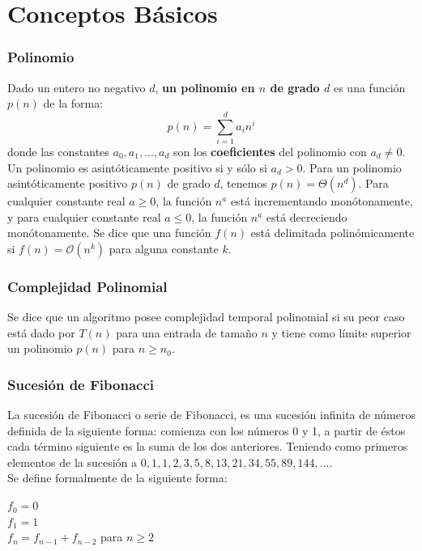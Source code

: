 \documentclass{report}
\begin{document}
\section*{Conceptos B\'asicos}
    \subsubsection*{Polinomio}
        Dado un entero no negativo $d$, \textbf{un polinomio en $n$ de grado $d$} es una función $p(n)$ de la forma:\\
        \[ p(n) = \sum_{i=1}^{d} a_{i}n^{i}\]
        donde las constantes $a_{0},a_{1},...,a_{d}$ son los \textbf{coeficientes} del polinomio con $a_{d}\neq0$. Un polinomio es asintóticamente positivo si y sólo si $a_{d}>0$. Para un polinomio asintóticamente positivo $p(n)$ de grado $d$, tenemos $p(n) = \Theta(n^{d})$. Para cualquier constante real $a\geq0$, la función $n^{a}$ está incrementando monótonamente, y para cualquier constante real $a\leq0$, la función $n^{a}$ está decreciendo monótonamente. Se dice que una función $f(n)$ está delimitada polinómicamente si $f(n) = \mathcal{O}(n^{k})$ para alguna constante $k$.
    \subsubsection*{Complejidad Polinomial}
        Se dice que un algoritmo posee complejidad temporal polinomial si su peor caso está dado por $T(n)$ para una entrada de tamaño $n$ y tiene como límite superior un polinomio $p(n)$ para $n \geq n_{0}$.
    \subsubsection*{Sucesión de Fibonacci}
        La sucesión de Fibonacci o serie de Fibonacci, es una sucesión infinita de números definida de la siguiente forma: comienza con los números 0 y 1, a partir de éstos cada término siguiente es la suma de los dos anteriores. Teniendo como primeros elementos de la sucesión a $0, 1, 1, 2, 3, 5, 8, 13, 21, 34, 55, 89, 144, ...$.\\
    
        Se define formalmente de la siguiente forma:
        
        \begin{flushleft}
            $f_{0} = 0$\\
            $f_{1} = 1$\\
            $f_{n} = f_{n-1} + f_{n-2}$ para $n\geq2$\\
        \end{flushleft}
        
\end{document}
